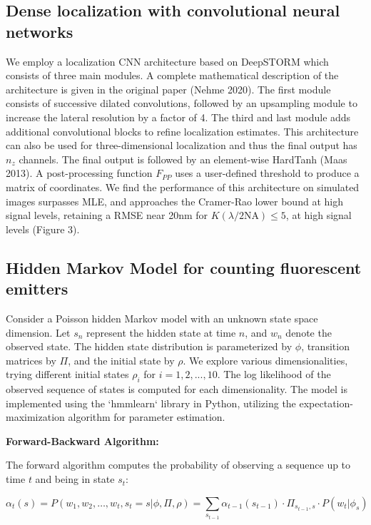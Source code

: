 \documentclass{ucetd}
\begin{document}
\subsection{Dense localization with convolutional neural networks}

We employ a localization CNN architecture based on DeepSTORM which consists of three main modules. A complete mathematical description of the architecture is given in the original paper (Nehme 2020). The first module consists of successive dilated convolutions, followed by an upsampling module to increase the lateral resolution by a factor of 4. The third and last module adds additional convolutional blocks to refine localization estimates. This architecture can also be used for three-dimensional localization and thus the final output has $n_{z}$ channels. The final output is followed by an element-wise HardTanh (Maas 2013). A post-processing function $F_{PP}$ uses a user-defined threshold to produce a matrix of coordinates. We find the performance of this architecture on simulated images surpasses MLE, and approaches the Cramer-Rao lower bound at high signal levels, retaining a RMSE near 20nm for $K(\lambda/2\mathrm{NA}) \leq 5$, at high signal levels (Figure 3). 

\subsection{Hidden Markov Model for counting fluorescent emitters}

Consider a Poisson hidden Markov model with an unknown state space dimension. Let $s_{n}$ represent the hidden state at time $n$, and $w_{n}$ denote the observed state. The hidden state distribution is parameterized by $\phi$, transition matrices by $\Pi$, and the initial state by $\rho$. We explore various dimensionalities, trying different initial states $\rho_i$ for $i = 1, 2, ..., 10$. The log likelihood of the observed sequence of states is computed for each dimensionality. The model is implemented using the `hmmlearn` library in Python, utilizing the expectation-maximization algorithm for parameter estimation.

\textbf{Forward-Backward Algorithm:}

The forward algorithm computes the probability of observing a sequence up to time \(t\) and being in state \(s_t\):

\[
\alpha_t(s) = P(w_1, w_2, \ldots, w_t, s_t = s | \phi, \Pi, \rho) = \sum_{s_{t-1}} \alpha_{t-1}(s_{t-1}) \cdot \Pi_{s_{t-1}, s} \cdot P(w_t | \phi_s)
\]
\end{document}
